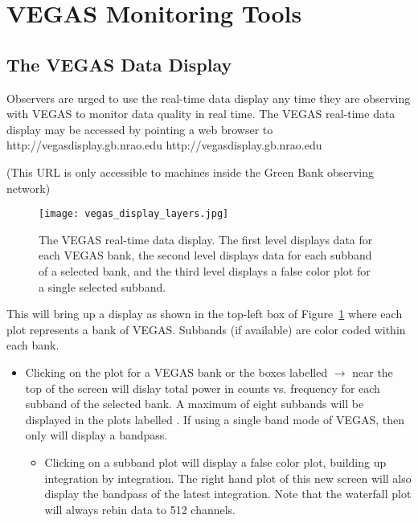 \newpage

\section {VEGAS Monitoring Tools}\label{sec:vegas_monitoring_tools}

\subsection {The VEGAS Data Display}\label{sec:vegasdisplay}
Observers are urged to use the real-time data display any time they are observing with
\gls{VEGAS} to monitor data quality in real time. The \gls{VEGAS} real-time data display
may be accessed by pointing a web browser to \htmladdnormallink
{http://vegasdisplay.gb.nrao.edu}
{http://vegasdisplay.gb.nrao.edu}
\begin{center}
(This URL is only accessible to machines inside the Green Bank observing network)
\end{center}

\vspace{-2.5mm}

\begin{figure}[!h]
\setlength{\abovecaptionskip}{0pt}\setlength{\belowcaptionskip}{0pt}
\begin{center}
\texttt{[image: vegas\_display\_layers.jpg]}
\caption[The VEGAS real-time data display]{The VEGAS real-time data display.
The first level displays data for each \gls{VEGAS} bank, the second level displays data for
each subband of a selected bank, and the third level displays a false color 
plot for a single selected subband.
\label{fig:vegas_real_time_display}}
\end{center}
\end{figure}

\vspace{-2.5mm}

\noindent This will bring up a display as shown in the top-left box of
Figure~\ref{fig:vegas_real_time_display} where each plot represents a bank of \gls{VEGAS}.
Subbands (if available) are color coded within each bank.
\begin{itemize}
\item Clicking on the plot for a \gls{VEGAS} bank or the boxes labelled
$\rightarrow$ near the top of the screen will dislay total power in counts
vs. frequency for each subband of the selected bank. A maximum of eight subbands will
be displayed in the plots labelled .  If using a single band
mode of \gls{VEGAS}, then only  will display a bandpass.
\begin{itemize}
\item Clicking on a subband plot will display a false color  plot, building
up integration by integration.  The right hand plot of this new screen will also display
the bandpass of the latest integration.  Note that the waterfall plot will always rebin
data to 512 channels.
\end{itemize}
\end{itemize}


